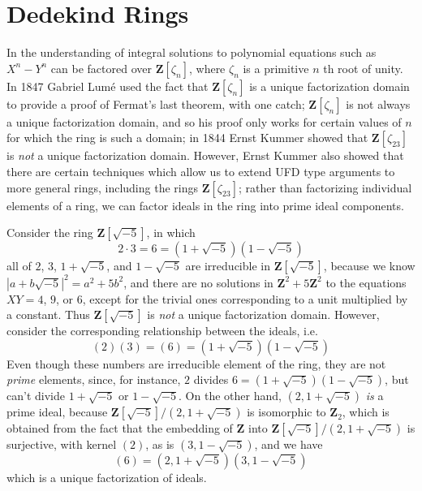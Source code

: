 \section{Dedekind Rings}

In the understanding of integral solutions to polynomial equations such as $X^n - Y^n$ can be factored over $\mathbf{Z}[\zeta_n]$, where $\zeta_n$ is a primitive $n$ th root of unity. In 1847 Gabriel Lum\'{e} used the fact that $\mathbf{Z}[\zeta_n]$ is a unique factorization domain to provide a proof of Fermat's last theorem, with one catch; $\mathbf{Z}[\zeta_n]$ is not always a unique factorization domain, and so his proof only works for certain values of $n$ for which the ring is such a domain; in 1844 Ernst Kummer showed that $\mathbf{Z}[\zeta_{23}]$ is {\it not} a unique factorization domain. However, Ernst Kummer also showed that there are certain techniques which allow us to extend UFD type arguments to more general rings, including the rings $\mathbf{Z}[\zeta_{23}]$; rather than factorizing individual elements of a ring, we can factor ideals in the ring into prime ideal components.

\begin{example}
    Consider the ring $\mathbf{Z}[\sqrt{-5}]$, in which
    \[ 2 \cdot 3 = 6 = (1 + \sqrt{-5})(1 - \sqrt{-5}) \]
    all of $2$, $3$, $1 + \sqrt{-5}$, and $1 - \sqrt{-5}$ are irreducible in $\mathbf{Z}[\sqrt{-5}]$, because we know $|a + b\sqrt{-5}|^2 = a^2 + 5b^2$, and there are no solutions in $\mathbf{Z}^2 + 5\mathbf{Z}^2$ to the equations $XY = 4$, $9$, or $6$, except for the trivial ones corresponding to a unit multiplied by a constant. Thus $\mathbf{Z}[\sqrt{-5}]$ is {\it not} a unique factorization domain. However, consider the corresponding relationship between the ideals, i.e.
    \[ (2) (3) = (6) = (1 + \sqrt{-5})(1 - \sqrt{-5}) \]
    Even though these numbers are irreducible element of the ring, they are not {\it prime} elements, since, for instance, $2$ divides $6 = (1 + \sqrt{-5})(1 - \sqrt{-5})$, but can't divide $1 + \sqrt{-5}$ or $1 - \sqrt{-5}$. On the other hand, $(2, 1 + \sqrt{-5})$ {\it is} a prime ideal, because $\mathbf{Z}[\sqrt{-5}]/(2, 1 + \sqrt{-5})$ is isomorphic to $\mathbf{Z}_2$, which is obtained from the fact that the embedding of $\mathbf{Z}$ into $\mathbf{Z}[\sqrt{-5}]/(2, 1 + \sqrt{-5})$ is surjective, with kernel $(2)$, as is $(3, 1 - \sqrt{-5})$, and we have
    \[ (6) = (2, 1 + \sqrt{-5})(3, 1 - \sqrt{-5}) \]
    which is a unique factorization of ideals.
\end{example}

